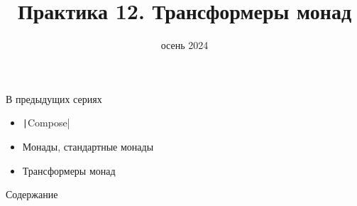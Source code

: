 
\newif\ifhandout




\title[12. Трансформеры монад]{Практика 12. Трансформеры монад}
\date{осень 2024}



    \setcounter{framenumber}{-1}
    \mymaketitle

    \begin{frame}[fragile]{В предыдущих сериях}
        \begin{itemize}
            \item \texttt|Compose|
            \item Монады, стандартные монады
            \item[\newtopic] Трансформеры монад
        \end{itemize}
    \end{frame}

    \begin{frame}[noframenumbering]{Содержание}
        \tableofcontents
    \end{frame}



